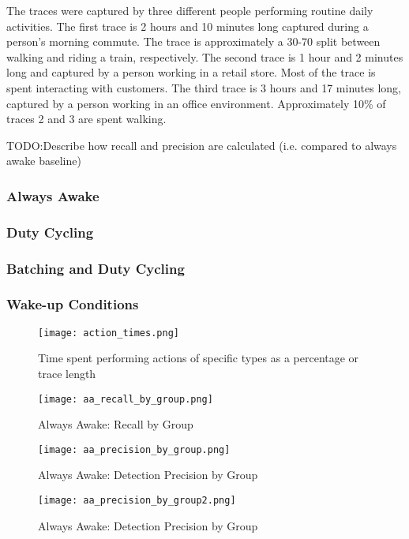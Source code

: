 The traces were captured by three different people performing routine daily activities. The first trace is 2 hours and 10 minutes long captured during a person's morning commute. The trace is approximately a 30-70 split between walking and riding a train, respectively. The second trace is 1 hour and 2 minutes long and captured by a person working in a retail store. Most of the trace is spent interacting with customers. The third trace is 3 hours and 17 minutes long, captured by a person working in an office environment. Approximately 10\% of traces 2 and 3 are spent walking.

TODO:Describe how recall and precision are calculated (i.e. compared to always awake baseline)

\subsubsection{Always Awake}

\subsubsection{Duty Cycling}

\subsubsection{Batching and Duty Cycling}

\subsubsection{Wake-up Conditions}

\begin{figure}[p]
	\texttt{[image: action\_times.png]}
	\caption{Time spent performing actions of specific types as a percentage or trace length}
    	\label{fig:actionTimes}
\end{figure}

\begin{figure}[p]
	\texttt{[image: aa\_recall\_by\_group.png]}
	\caption{Always Awake: Recall by Group}
    	\label{fig:aaRecallByGroup}
\end{figure}


\begin{figure}[p]
	\texttt{[image: aa\_precision\_by\_group.png]}
	\caption{Always Awake: Detection Precision by Group}
    	\label{fig:aaPrecisionByGroup}
\end{figure}


\begin{figure}[p]
	\texttt{[image: aa\_precision\_by\_group2.png]}
	\caption{Always Awake: Detection Precision by Group}
    	\label{fig:aaPrecisionByGroup2}
\end{figure}


